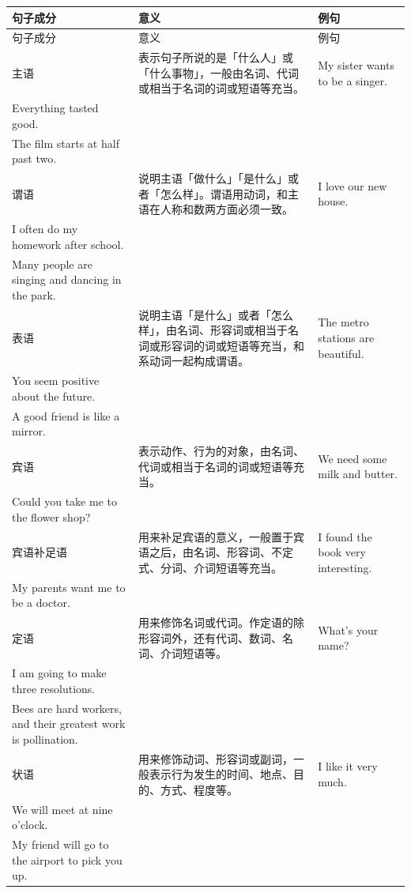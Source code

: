 \documentclass[11pt,a4paper]{ctexart}
\begin{document}
{\footnotesize
\begin{longtable}{p{4.47cm}p{4.47cm}p{4.47cm}}
\hline
句子成分 & 意义 & 例句 \\
\hline
\endfirsthead
\hline
句子成分 & 意义 & 例句 \\
\hline
\endhead
\hline
\endfoot
主语 & 表示句子所说的是「什么人」或「什么事物」，一般由名词、代词或相当于名词的词或短语等充当。 & My sister wants to be a singer.\\ Everything tasted good.\\ The film starts at half past two. \\
谓语 & 说明主语「做什么」「是什么」或者「怎么样」。谓语用动词，和主语在人称和数两方面必须一致。 & I love our new house.\\ I often do my homework after school.\\ Many people are singing and dancing in the park. \\
表语 & 说明主语「是什么」或者「怎么样」，由名词、形容词或相当于名词或形容词的词或短语等充当，和系动词一起构成谓语。 & The metro stations are beautiful.\\ You seem positive about the future.\\ A good friend is like a mirror. \\
宾语 & 表示动作、行为的对象，由名词、代词或相当于名词的词或短语等充当。 & We need some milk and butter.\\ Could you take me to the flower shop? \\
宾语补足语 & 用来补足宾语的意义，一般置于宾语之后，由名词、形容词、不定式、分词、介词短语等充当。 & I found the book very interesting.\\ My parents want me to be a doctor. \\
定语 & 用来修饰名词或代词。作定语的除形容词外，还有代词、数词、名词、介词短语等。 & What’s your name?\\ I am going to make three resolutions.\\ Bees are hard workers, and their greatest work is pollination. \\
状语 & 用来修饰动词、形容词或副词，一般表示行为发生的时间、地点、目的、方式、程度等。 & I like it very much.\\ We will meet at nine o’clock.\\ My friend will go to the airport to pick you up. \\
\end{longtable}
}
\end{document}
